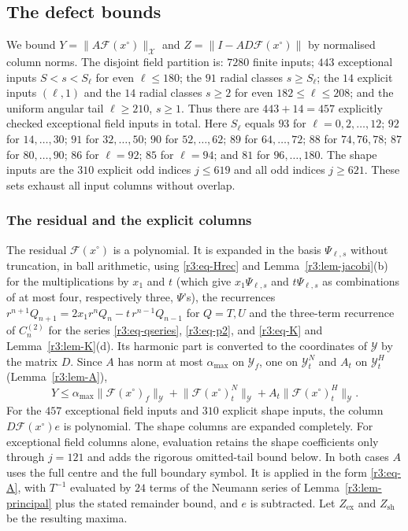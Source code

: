 \documentclass[11pt]{amsart}
\theoremstyle{definition}
\theoremstyle{remark}
\numberwithin{equation}{section}
\newcommand{\Fc}{\mathcal{F}}
\newcommand{\nrm}[1]{\lVert #1\rVert}
\begin{document}
\subsection{The defect bounds}\label{r3:sec-Z}

We bound $Y=\nrm{A\Fc(x^\circ)}_{\mathcal X}$ and $Z=\nrm{I-AD\Fc(x^\circ)}$ by normalised column norms. The disjoint field partition is: $7280$ finite inputs; $443$ exceptional inputs $S<s<S_\ell$ for even $\ell\leq180$; the $91$ radial classes $s\geq S_\ell$; the $14$ explicit inputs $(\ell,1)$ and the $14$ radial classes $s\geq2$ for even $182\leq\ell\leq208$; and the uniform angular tail $\ell\geq210$, $s\geq1$. Thus there are $443+14=457$ explicitly checked exceptional field inputs in total. Here $S_\ell$ equals $93$ for $\ell=0,2,\ldots,12$; $92$ for $14,\ldots,30$; $91$ for $32,\ldots,50$; $90$ for $52,\ldots,62$; $89$ for $64,\ldots,72$; $88$ for $74,76,78$; $87$ for $80,\ldots,90$; $86$ for $\ell=92$; $85$ for $\ell=94$; and $81$ for $96,\ldots,180$. The shape inputs are the $310$ explicit odd indices $j\leq619$ and all odd indices $j\geq621$. These sets exhaust all input columns without overlap.

\subsubsection*{The residual and the explicit columns}
The residual $\Fc(x^\circ)$ is a polynomial. It is expanded in the basis $\Psi_{\ell,s}$ without truncation, in ball arithmetic, using \eqref{r3:eq-Hrec} and Lemma~\ref{r3:lem-jacobi}(b) for the multiplications by $x_1$ and $t$ (which give $x_1\Psi_{\ell,s}$ and $t\Psi_{\ell,s}$ as combinations of at most four, respectively three, $\Psi$'s), the recurrences $r^{n+1}Q_{n+1}=2x_1r^nQ_n-t\,r^{n-1}Q_{n-1}$ for $Q=T,U$ and the three-term recurrence of $C^{(2)}_n$ for the series \eqref{r3:eq-qseries}, \eqref{r3:eq-p2}, and \eqref{r3:eq-K} and Lemma~\ref{r3:lem-K}(d). Its harmonic part is converted to the coordinates of $\mathcal Y$ by the matrix $D$. Since $A$ has norm at most $\alpha_{\max}$ on $\mathcal Y_f$, one on $\mathcal Y^N_t$ and $A_t$ on $\mathcal Y^H_t$ (Lemma~\ref{r3:lem-A}),
\[
Y\leq\alpha_{\max}\nrm{\Fc(x^\circ)_f}_{\mathcal Y}+\nrm{\Fc(x^\circ)^N_t}_{\mathcal Y}+A_t\nrm{\Fc(x^\circ)^H_t}_{\mathcal Y} .
\]
For the $457$ exceptional field inputs and $310$ explicit shape inputs, the column $D\Fc(x^\circ)e$ is polynomial. The shape columns are expanded completely. For exceptional field columns alone, evaluation retains the shape coefficients only through $j=121$ and adds the rigorous omitted-tail bound below. In both cases $A$ uses the full centre and the full boundary symbol. It is applied in the form \eqref{r3:eq-A}, with $T^{-1}$ evaluated by $24$ terms of the Neumann series of Lemma~\ref{r3:lem-principal} plus the stated remainder bound, and $e$ is subtracted. Let $Z_{\mathrm{ex}}$ and $Z_{\mathrm{sh}}$ be the resulting maxima.
\end{document}

